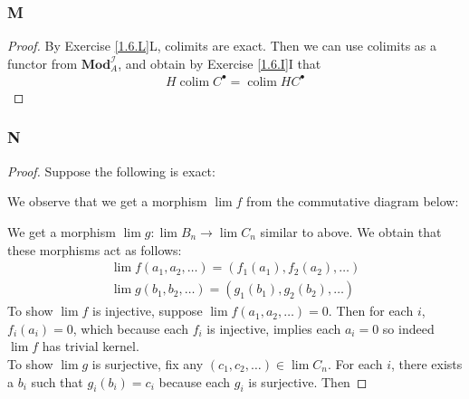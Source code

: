 \documentclass{article}
\newcommand{\fI}{\mathscr{I}}
\DeclareMathOperator{\colim}{colim}
\newcommand{\Mod}{\mathbf{Mod}} %
\begin{document}
\subsubsection{M}
\begin{proof}
    By Exercise \ref{1.6.L}L, colimits are exact. Then we can use colimits as a functor from $\Mod_A^\fI$, and obtain by Exercise \ref{1.6.I}I that
    \begin{align*}
        H \colim C^\bullet =\colim HC^\bullet
    \end{align*}
\end{proof}
\subsubsection{N}\label{1.6.N}
\begin{proof}
    Suppose the following is exact:
    \begin{center}
    \end{center}
    We observe that we get a morphism $\lim f$ from the commutative diagram below:
   \begin{center}
    \end{center}
    We get a morphism $\lim g:\lim B_n \to \lim C_n$ similar to above. We obtain that these morphisms act as follows:
    \begin{align*}
        \lim f(a_1,a_2,\dots)=(f_1(a_1),f_2(a_2),\dots)\\
        \lim g(b_1,b_2,\dots)=(g_1(b_1),g_2(b_2),\dots)
    \end{align*}
    To show $\lim f$ is injective, suppose $\lim f(a_1,a_2,\dots)=0$. Then for each $i$, $f_i(a_i)=0$, which because each $f_i$ is injective, implies each $a_i=0$ so indeed $\lim f$ has trivial kernel.\\
    To show $\lim g$ is surjective, fix any $(c_1,c_2,\dots)\in \lim C_n$. For each $i$, there exists a $b_i$ such that $g_i(b_i)=c_i$ because each $g_i$ is surjective. Then

\end{proof}
\end{document}
